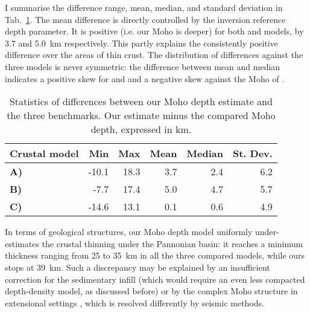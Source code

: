 I summarise the difference range, mean, median, and standard deviation in Tab.~\ref{tab:MohoCompStats}.
The mean difference is directly controlled by the inversion reference depth parameter.
It is positive (i.e. our Moho is deeper) for both \textcite{Grad2009} and \textcite{Reguzzoni2015} models, by 3.7 and 5.0~\si{\kilo \metre} respectively.
This partly explains the consistently positive difference over the areas of thin crust.
The distribution of differences against the three models is never symmetric: the difference between mean and median indicates a positive skew for \textcite{Grad2009} and \textcite{Reguzzoni2015} and a negative skew against the Moho of \textcite{Pasyanos2014}.

\begin{table}
    \caption[Statistics of differences between the Moho depth estimate and the three benchmarks.]{Statistics of differences between our Moho depth estimate and the three benchmarks. Our estimate minus the compared Moho depth, expressed in \si{\kilo \metre}.}
    \begin{adjustbox}{center}
    \begingroup\setlength{\fboxsep}{0pt}
    \colorbox{tablebackground}{%
	\begin{tabular}{lrrrrr}
		\toprule
		 \textbf{Crustal model} & \textbf{Min} & \textbf{Max} & \textbf{Mean} & \textbf{Median} & \textbf{St. Dev.} \\
		\midrule
		\textbf{A)}~\textcite{Grad2009} & -10.1 & 18.3 & 3.7 & 2.4 & 6.2 \\
		\textbf{B)}~\textcite{Reguzzoni2015} & -7.7 & 17.4 & 5.0 & 4.7 & 5.7 \\
		\textbf{C)}~\textcite{Pasyanos2014} & -14.6 & 13.1 & 0.1 & 0.6 & 4.9 \\
		\bottomrule
    \end{tabular}
    }\endgroup
    \end{adjustbox}
	\label{tab:MohoCompStats}
\end{table}

In terms of geological structures, our Moho depth model uniformly under-estimates the crustal thinning under the Pannonian basin: it reaches a minimum thickness ranging from 25 to 35~\si{\kilo \metre} in all the three compared models, while ours stops at 39~\si{\kilo \metre}.
Such a discrepancy may be explained by an insufficient correction for the sedimentary infill (which would require an even less compacted depth-density model, as discussed before) or by the complex Moho structure in extensional settings \parencite[e.g. due to underplating, see][]{OReilly2013}, which is resolved differently by seismic methods.


